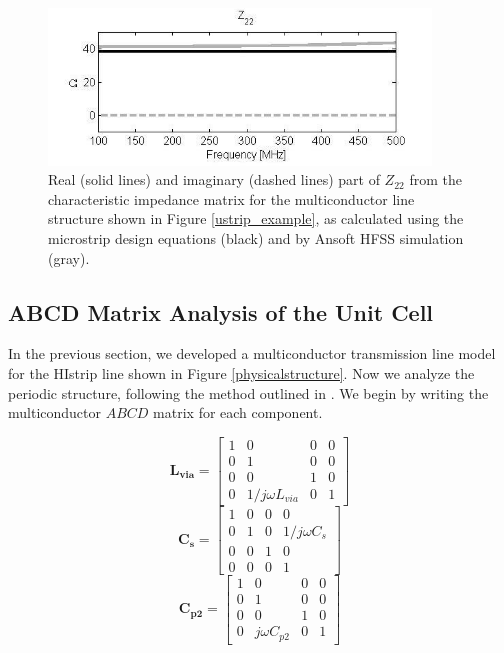 \documentclass{allertonproc}
\begin{document}
\begin{figure}[tpb]
\begin{center}
\includegraphics[width=4in]{Zchar22}
\caption{Real (solid lines) and imaginary (dashed lines) part of $Z_{22}$ from the characteristic impedance matrix for the multiconductor line structure shown in Figure \ref{ustrip_example}, as calculated using the microstrip design equations (black) and by Ansoft HFSS simulation (gray).}
\label{Zchar22}
\end{center}
\end{figure}

\subsection{ABCD Matrix Analysis of the Unit Cell}
In the previous section, we developed a multiconductor transmission line model for the HIstrip line shown in Figure \ref{physicalstructure}.  Now we analyze the periodic structure, following the method outlined in \cite{faria2004}.  We begin by writing the multiconductor $ABCD$ matrix for each component.

\begin{equation}
\mathbf{L_{via}} = \begin{bmatrix}1 & 0 & 0 & 0\\0 & 1 & 0 & 0\\ 0 & 0 & 1 & 0\\ 0 & 1/j\omega L_{via} & 0 &1\end{bmatrix}
\end{equation}
\begin{equation}
\mathbf{C_s} = \begin{bmatrix}1 & 0 & 0 & 0\\0 & 1 & 0 & 1/j\omega C_s\\ 0 & 0 & 1 & 0\\ 0 & 0 & 0 &1\end{bmatrix}
\end{equation}
\begin{equation}
\mathbf{C_{p2}} = \begin{bmatrix}1 & 0 & 0 & 0\\0 & 1 & 0 & 0\\ 0 & 0 & 1 & 0\\ 0 & j\omega C_{p2} & 0 &1\end{bmatrix}
\end{equation}
\end{document}
